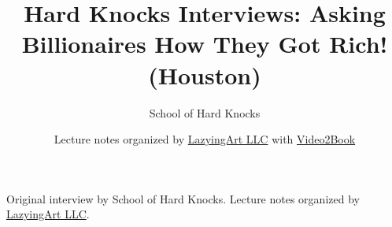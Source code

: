 \documentclass[11pt,oneside]{book}
\begin{document}
\frontmatter
\title{Hard Knocks Interviews: Asking Billionaires How They Got Rich! (Houston)}
\author{School of Hard Knocks}
\date{Lecture notes organized by \href{https://lazying.art}{LazyingArt LLC} with \href{https://github.com/lachlanchen/Video2Book}{Video2Book}}
\maketitle
\begin{center}
\small Original interview by School of Hard Knocks. Lecture notes organized by \href{https://lazying.art}{LazyingArt LLC}.
\end{center}
\clearpage
\mainmatter

\end{document}
